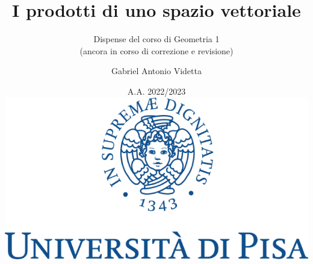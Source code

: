 \documentclass[11pt]{scrbook}
\begin{document}
	
	\title{I prodotti di uno spazio vettoriale}
	\subtitle{Dispense del corso di Geometria 1\\(ancora in corso di correzione e revisione)}
	\author{Gabriel Antonio Videtta}
	\date{A.A. 2022/2023 \\ \vskip 1in \includegraphics[scale=0.3]{logo.png}}
	\maketitle
	
	\newpage
	\thispagestyle{empty}
	~\newpage
	
	\tableofcontents

	\newpage
	\thispagestyle{empty}
	~\newpage
	
	

	\newpage
	\thispagestyle{empty}
	~\newpage
	
	

	\newpage
	\thispagestyle{empty}
	~\newpage
	
	
	
\end{document}
